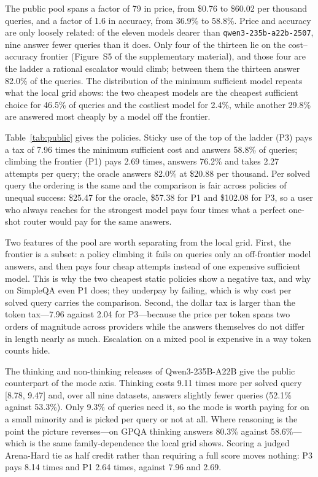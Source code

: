 The public pool spans a factor of 79 in price, from \$0.76 to \$60.02 per
thousand queries, and a factor of 1.6 in accuracy, from 36.9\% to 58.8\%.
Price and accuracy are only loosely related: of the eleven models dearer than
\texttt{qwen3-235b-a22b-2507}, nine answer fewer queries than it does. Only
four of the thirteen lie on the cost--accuracy frontier (Figure~S5 of the
supplementary material), and those four are the ladder a rational escalator
would climb; between them the thirteen answer 82.0\% of the queries. The
distribution of the minimum sufficient model repeats what the local grid
shows: the two cheapest models are the cheapest sufficient choice for 46.5\%
of queries and the costliest model for 2.4\%, while another 29.8\% are
answered most cheaply by a model off the frontier.

Table~\ref{tab:public} gives the policies. Sticky use of the top of the
ladder (P3) pays a tax of 7.96 times the minimum sufficient cost and answers
58.8\% of queries; climbing the frontier (P1) pays 2.69 times, answers 76.2\%
and takes 2.27 attempts per query; the oracle answers 82.0\% at \$20.88 per
thousand. Per solved query the ordering is the same and the comparison is
fair across policies of unequal success: \$25.47 for the oracle, \$57.38 for
P1 and \$102.08 for P3, so a user who always reaches for the strongest model
pays four times what a perfect one-shot router would pay for the same
answers.

Two features of the pool are worth separating from the local grid. First, the
frontier is a subset: a policy climbing it fails on queries only an
off-frontier model answers, and then pays four cheap attempts instead of one
expensive sufficient model. This is why the two cheapest static policies show
a negative tax, and why on SimpleQA even P1 does; they underpay by failing,
which is why cost per solved query carries the comparison. Second, the dollar
tax is larger than the token tax---7.96 against 2.04 for P3---because the
price per token spans two orders of magnitude across providers while the
answers themselves do not differ in length nearly as much. Escalation on a
mixed pool is expensive in a way token counts hide.

The thinking and non-thinking releases of Qwen3-235B-A22B give the public
counterpart of the mode axis. Thinking costs 9.11 times more per solved query
[8.78, 9.47] and, over all nine datasets, answers slightly fewer queries
(52.1\% against 53.3\%). Only 9.3\% of queries need it, so the mode is worth
paying for on a small minority and is picked per query or not at all. Where
reasoning is the point the picture reverses---on GPQA thinking answers 80.3\%
against 58.6\%---which is the same family-dependence the local grid shows.
Scoring a judged Arena-Hard tie as half credit rather than requiring a full
score moves nothing: P3 pays 8.14 times and P1 2.64 times, against 7.96 and
2.69.


